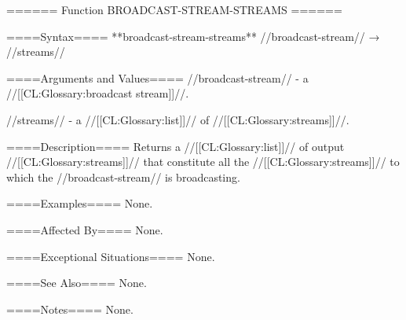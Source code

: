 ====== Function BROADCAST-STREAM-STREAMS ======

====Syntax====
**broadcast-stream-streams** //broadcast-stream// → //streams//

====Arguments and Values====
//broadcast-stream// - a //[[CL:Glossary:broadcast stream]]//.

//streams// - a //[[CL:Glossary:list]]// of //[[CL:Glossary:streams]]//.

====Description====
Returns a //[[CL:Glossary:list]]// of output //[[CL:Glossary:streams]]// that constitute all the //[[CL:Glossary:streams]]// to which the //broadcast-stream// is broadcasting.

====Examples====
None.

====Affected By====
None.

====Exceptional Situations====
None.

====See Also====
None.

====Notes====
None.

